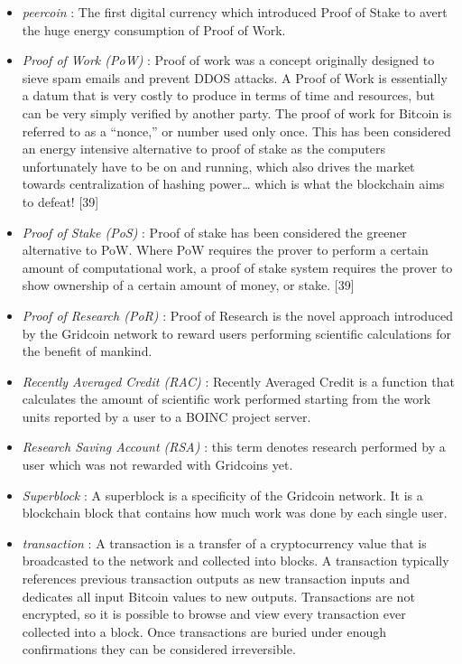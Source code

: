 \begin{itemize}
  \item \textit{peercoin} : The first digital currency which introduced Proof of Stake to avert the huge energy consumption of Proof of Work.
  \item \textit{Proof of Work (PoW)} : Proof of work was a concept originally designed to sieve spam emails and prevent DDOS attacks. A Proof of Work is essentially a datum that is very costly to produce in terms of time and resources, but can be very simply verified by another party. The proof of work for Bitcoin is referred to as a “nonce,” or number used only once. This has been considered an energy intensive alternative to proof of stake as the computers unfortunately have to be on and running, which also drives the market towards centralization of hashing power… which is what the blockchain aims to defeat! [39]
  \item \textit{Proof of Stake (PoS)} : Proof of stake has been considered the greener alternative to PoW. Where PoW requires the prover to perform a certain amount of computational work, a proof of stake system requires the prover to show ownership of a certain amount of money, or stake. [39]
  \item \textit{Proof of Research (PoR)} : Proof of Research is the novel approach introduced by the Gridcoin network to reward users performing scientific calculations for the benefit of mankind.
  \item \textit{Recently Averaged Credit (RAC)} : Recently Averaged Credit is a function that calculates the amount of scientific work performed starting from the work units reported by a user to a BOINC project server.
  \item \textit{Research Saving Account (RSA)} : this term denotes research performed by a user which was not rewarded with Gridcoins yet.
  \item \textit{Superblock} : A superblock is a specificity of the Gridcoin network. It is a blockchain block that contains how much work was done by each single user.
  \item \textit{transaction} : A transaction is a transfer of a cryptocurrency value that is broadcasted to the network and collected into blocks. A transaction typically references previous transaction outputs as new transaction inputs and dedicates all input Bitcoin values to new outputs. Transactions are not encrypted, so it is possible to browse and view every transaction ever collected into a block. Once transactions are buried under enough confirmations they can be considered irreversible.\\

\end{itemize}
